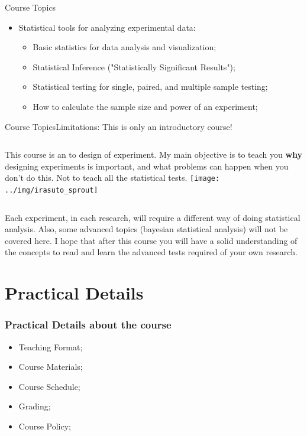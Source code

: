 \documentclass[aspectratio=169]{beamer}
\begin{document}
\begin{CJK}{UTF8}{ipxm}
\begin{frame}{Course Topics}
\begin{itemize}
    \item Statistical tools for analyzing experimental data:
    \begin{itemize}
      \item Basic statistics for data analysis and visualization;
      \item Statistical Inference ("Statistically Significant Results");
      \item Statistical testing for single, paired, and multiple sample testing;
      \item How to calculate the sample size and power of an experiment;
    \end{itemize}
  \end{itemize}
\end{frame}

\begin{frame}{Course Topics}{Limitations: This is only an introductory course!}

  \begin{columns}
    This course is an  to design of experiment. My main objective is to teach you {\bf why} designing experiments is important, and what problems can happen when you don't do this. Not to teach all the statistical tests.
      \texttt{[image: ../img/irasuto\_sprout]}
  \end{columns}
  \vfill

  Each experiment, in each research, will require a different way of doing statistical analysis. Also, some advanced topics (bayesian statistical analysis) will not be covered here. I hope that after this course you will have a solid understanding of the concepts to read and learn the advanced tests required of your own research.
\end{frame}

\section{Practical Details}
\begin{frame}
  \frametitle{Practical Details about the course}
  \begin{itemize}
    \item Teaching Format;
    \item Course Materials;
    \item Course Schedule;
    \item Grading;
    \item Course Policy;
  \end{itemize}\vfill


\end{frame}
\end{CJK}
\end{document}
